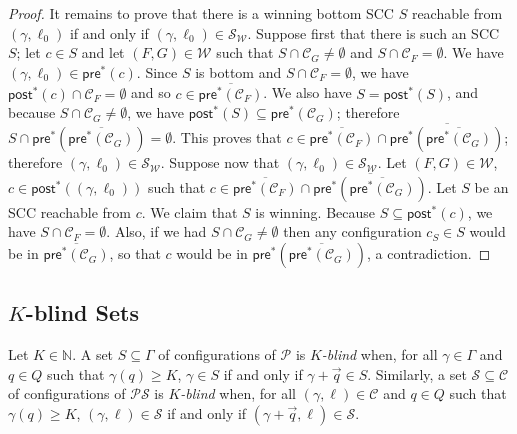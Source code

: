 \documentclass[10pt,a4paper]{article}
\let\mathbb\mathds
\renewcommand{\ge}{\geqslant}
\newcommand{\nats}{\mathbb{N}}
\newcommand{\prot}{\mathcal{P}}
\newcommand{\config}{\gamma}
\newcommand{\configs}{\Gamma}
\newcommand{\preop}{\mathsf{pre}}
\newcommand{\postop}{\mathsf{post}}
\newcommand{\prestar}[1]{\preop^*(#1)}
\newcommand{\poststar}[1]{\postop^*(#1)}
\newcommand*{\states}{Q}
\newcommand{\cSet}{\mathcal{S}}  %
\newcommand*{\abuchistate}{\ell}
\newcommand*{\bstate}{\abuchistate}
\newcommand*{\binitstate}{\bstate_0}
\newcommand*{\bwinning}{\mathcal{W}}
\newcommand{\prodsystem}{\mathcal{PS}}
\newcommand{\prodconfigs}{\mathcal{C}}
\newcommand{\prodconfigsproj}[1]{\prodconfigs_{#1}}
\newcommand{\prodconfig}{c}
\newcommand*{\setcomplement}[1]{\overline{#1}}
\newcommand{\ltlgre}{\cSet_\bwinning}
\begin{document}
\begin{proof}
	It remains to prove that there is a winning bottom SCC \(S\) reachable from \((\config, \binitstate)\) if and only if \((\config,\binitstate) \in \ltlgre\).
	Suppose first that there is such an SCC \(S\); let \(\prodconfig \in S\) and let \((F,G) \in \bwinning\) such that \(S \cap \prodconfigsproj{G} \ne \emptyset\) and \(S \cap \prodconfigsproj{F} = \emptyset\).
	We have \((\config, \binitstate) \in \prestar{\prodconfig}\).
	Since \(S\) is bottom and \(S \cap \prodconfigsproj{F} = \emptyset\), we have \(\poststar{\prodconfig} \cap \prodconfigsproj{F} = \emptyset\) and so \(\prodconfig \in \setcomplement{\prestar{\prodconfigsproj{F}}}\).
	We also have \(S = \poststar{S}\), and because \(S \cap \prodconfigsproj{G} \ne \emptyset\), we have \(\poststar{S}\subseteq \prestar{\prodconfigsproj{G}}\); therefore \(S \cap \prestar{\setcomplement{\prestar{\prodconfigsproj{G}}}} = \emptyset\).
	This proves that \(\prodconfig \in \setcomplement{\prestar{\prodconfigsproj{F}}} \cap \setcomplement{\prestar{\setcomplement{\prestar{\prodconfigsproj{G}}}}}\); therefore \((\config, \binitstate) \in \ltlgre\).
	Suppose now that \((\config,\binitstate) \in \ltlgre\).
	Let \((F,G) \in \bwinning\), \(\prodconfig \in \poststar{(\config, \binitstate)}\) such that \(\prodconfig \in \setcomplement{\prestar{\prodconfigsproj{F}}} \cap \setcomplement{\prestar{\setcomplement{\prestar{\prodconfigsproj{G}}}}}\).
	Let \(S\) be an SCC reachable from \(\prodconfig\).
	We claim that \(S\) is winning.
	Because \(S \subseteq \poststar{\prodconfig}\), we have \(S \cap \prodconfigsproj{F} = \emptyset\).
	Also, if we had \(S \cap \prodconfigsproj{G} \ne \emptyset\) then any configuration \(\prodconfig_S \in S\) would be in \(\setcomplement{\prestar{\prodconfigsproj{G}}}\), so that \(\prodconfig\) would be in \(\prestar{\setcomplement{\prestar{\prodconfigsproj{G}}}}\), a contradiction.
\end{proof}

%
\subsection{\texorpdfstring{\(K\)}{K}-blind Sets}
Let \(K \in \nats\).
A set \(S \subseteq \configs\) of configurations of \(\prot\) is \emph{\(K\)-blind} when, for all \(\config \in \configs\) and \(q \in \states\) such that \(\config(q) \ge K\), \(\config \in S\) if and only if \(\config+ \vec{q} \in S\).
Similarly, a set \(\cSet \subseteq \prodconfigs\) of configurations of \(\prodsystem\) is \emph{\(K\)-blind} when, for all \((\config,\bstate) \in \prodconfigs\) and \(q \in \states\) such that \(\config(q) \ge K\), \((\config,\bstate) \in \cSet\) if and only if \((\config+ \vec{q}, \bstate) \in \cSet\).
%
\end{document}
